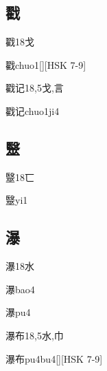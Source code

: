 \subsection*{戳}

\begin{Entry}{戳}{18}{⼽}
  \begin{Phonetics}{戳}{chuo1}[][HSK 7-9]
  \end{Phonetics}
\end{Entry}

\begin{Entry}{戳记}{18,5}{⼽,⾔}
  \begin{Phonetics}{戳记}{chuo1ji4}
  \end{Phonetics}
\end{Entry}

\subsection*{毉}

\begin{Entry}{毉}{18}{⼖}
  \begin{Phonetics}{毉}{yi1}
  \end{Phonetics}
\end{Entry}

\subsection*{瀑}

\begin{Entry}{瀑}{18}{⽔}
  \begin{Phonetics}{瀑}{bao4}
  \end{Phonetics}
  \begin{Phonetics}{瀑}{pu4}
  \end{Phonetics}
\end{Entry}

\begin{Entry}{瀑布}{18,5}{⽔,⼱}
  \begin{Phonetics}{瀑布}{pu4bu4}[][HSK 7-9]
  \end{Phonetics}
\end{Entry}

